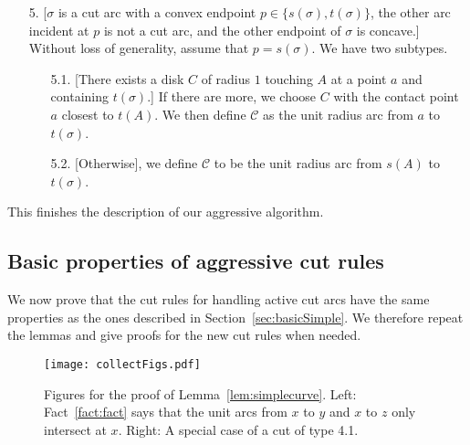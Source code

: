 \documentclass{article}
\newcommand{\se}{\sigma}
\newcommand{\cut}{\mathcal C}
\newcommand{\start}{s}
\newcommand{\terminal}{t}
\newcommand{\arcA}{A}
\begin{document}
\begin{enumerate}
\item[5.]
[$\se$ is a cut arc with a convex endpoint $p\in\{\start(\se),\terminal(\se)\}$, the other arc incident at $p$ is not a cut arc, and the other endpoint of $\se$ is concave.]
Without loss of generality, assume that $p=\start(\se)$.
We have two subtypes.
\begin{enumerate}
\item[5.1.]
[There exists a disk $C$ of radius $1$ touching $\arcA$ at a point $a$ and containing $\terminal(\se)$.]
If there are more, we choose $C$ with the contact point $a$ closest to $\terminal(\arcA)$.
We then define $\cut$ as the unit radius arc from $a$ to $\terminal(\se)$.

\item[5.2.]
[Otherwise], we define $\cut$ to be the unit radius arc from $\start(\arcA)$ to $\terminal(\se)$.
\end{enumerate}

\end{enumerate}

This finishes the description of our aggressive algorithm.



\subsection{Basic properties of aggressive cut rules}

We now prove that the cut rules for handling active cut arcs have the same properties as the ones described in Section~\ref{sec:basicSimple}.
We therefore repeat the lemmas and give proofs for the new cut rules when needed.

\simplecurvelemma*


\begin{figure}
\centering
\texttt{[image: collectFigs.pdf]}
\caption{Figures for the proof of Lemma~\ref{lem:simplecurve}.
Left: Fact~\ref{fact:fact} says that the unit arcs from $x$ to $y$ and $x$ to $z$ only intersect at $x$.
Right: A special case of a cut of type 4.1.
}
\label{fig:factetc}
\end{figure}
\end{document}
